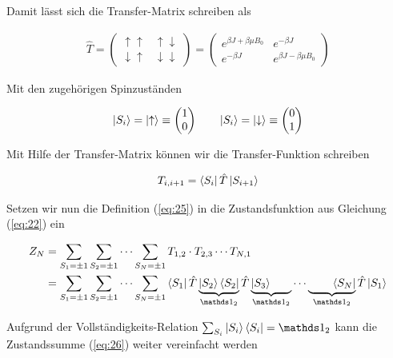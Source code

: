 Damit lässt sich die Transfer-Matrix schreiben als

\begin{align}
  \label{eq:23}
\hat T =
\begin{pmatrix}
   \uparrow \uparrow&  \uparrow\downarrow \\
   \downarrow\uparrow& \downarrow\downarrow
\end{pmatrix} = 
\begin{pmatrix}
  e^{\beta J  + \beta \mu B_0 }&e^{-\beta J }\\
 e^{-\beta J }&e^{\beta J  - \beta \mu B_0 }
\end{pmatrix}
\end{align}

Mit den zugehörigen Spinzuständen

\begin{align}
  \label{eq:24}
  \left| S_i \right\rangle = \left| \uparrow \right\rangle \equiv
  \begin{pmatrix}
    1\\0
  \end{pmatrix}
\qquad
  \left| S_i \right\rangle = \left| \downarrow \right\rangle \equiv
  \begin{pmatrix}
    0\\1
  \end{pmatrix}
\end{align}

Mit Hilfe der Transfer-Matrix können wir die Transfer-Funktion schreiben

\begin{align}
  \label{eq:25}
  T_{i,i+1} =  \left\langle S_i \right| \hat T \left| S_{i+1} \right\rangle
\end{align}

Setzen wir nun die Definition (\ref{eq:25}) in die Zustandsfunktion aus Gleichung (\ref{eq:22}) ein

\begin{align}
  \label{eq:26}
  Z_N &=\sum_{S_1=\pm 1}\sum_{S_2=\pm 1}\cdots \sum_{S_N=\pm 1} T_{1,2}\cdot T_{2,3}\cdots T_{N,1} \notag \\
&=\sum_{S_1=\pm 1}\sum_{S_2=\pm 1}\cdots \sum_{S_N=\pm 1}\bra{S_1} \hat T \underbr{\ket{S_{2}} \bra{S_2}}_{\mathds 1_2} \hat T \underbr{\ket{S_{3}} \hphantom{\bra{S_3}} }_{\mathds 1_2}\cdots\underbr{\hphantom{\bra{S_N} } \bra{S_N}}_{\mathds 1_2} \hat T \ket{S_{1}}
\end{align}

Aufgrund der Vollständigkeits-Relation \(\sum_{S_i}\ket{S_i}\bra{S_i}=\mathds 1_2 \) kann die Zustandssumme (\ref{eq:26}) weiter vereinfacht werden

